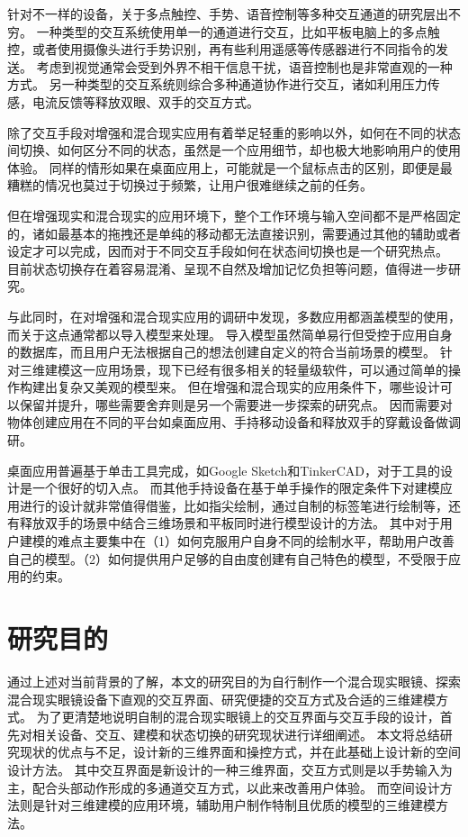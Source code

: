 针对不一样的设备，关于多点触控、手势、语音控制等多种交互通道的研究层出不穷。
一种类型的交互系统使用单一的通道进行交互，比如平板电脑上的多点触控，或者使用摄像头进行手势识别，再有些利用遥感等传感器进行不同指令的发送。
考虑到视觉通常会受到外界不相干信息干扰，语音控制也是非常直观的一种方式。
另一种类型的交互系统则综合多种通道协作进行交互，诸如利用压力传感，电流反馈等释放双眼、双手的交互方式。

除了交互手段对增强和混合现实应用有着举足轻重的影响以外，如何在不同的状态间切换、如何区分不同的状态，虽然是一个应用细节，却也极大地影响用户的使用体验。
同样的情形如果在桌面应用上，可能就是一个鼠标点击的区别，即便是最糟糕的情况也莫过于切换过于频繁，让用户很难继续之前的任务。

但在增强现实和混合现实的应用环境下，整个工作环境与输入空间都不是严格固定的，诸如最基本的拖拽还是单纯的移动都无法直接识别，需要通过其他的辅助或者设定才可以完成，因而对于不同交互手段如何在状态间切换也是一个研究热点。
目前状态切换存在着容易混淆、呈现不自然及增加记忆负担等问题，值得进一步研究。

与此同时，在对增强和混合现实应用的调研中发现，多数应用都涵盖模型的使用，而关于这点通常都以导入模型来处理。
导入模型虽然简单易行但受控于应用自身的数据库，而且用户无法根据自己的想法创建自定义的符合当前场景的模型。
针对三维建模这一应用场景，现下已经有很多相关的轻量级软件，可以通过简单的操作构建出复杂又美观的模型来。
但在增强和混合现实的应用条件下，哪些设计可以保留并提升，哪些需要舍弃则是另一个需要进一步探索的研究点。
因而需要对物体创建应用在不同的平台如桌面应用、手持移动设备和释放双手的穿戴设备做调研。

桌面应用普遍基于单击工具完成，如Google Sketch和TinkerCAD，对于工具的设计是一个很好的切入点。
而其他手持设备在基于单手操作的限定条件下对建模应用进行的设计就非常值得借鉴，比如指尖绘制，通过自制的标签笔进行绘制等，还有释放双手的场景中结合三维场景和平板同时进行模型设计的方法。
其中对于用户建模的难点主要集中在（1）如何克服用户自身不同的绘制水平，帮助用户改善自己的模型。（2）如何提供用户足够的自由度创建有自己特色的模型，不受限于应用的约束。

\section{研究目的}
\label{sec:xulun-mudi}
通过上述对当前背景的了解，本文的研究目的为自行制作一个混合现实眼镜、探索混合现实眼镜设备下直观的交互界面、研究便捷的交互方式及合适的三维建模方式。
为了更清楚地说明自制的混合现实眼镜上的交互界面与交互手段的设计，首先对相关设备、交互、建模和状态切换的研究现状进行详细阐述。
本文将总结研究现状的优点与不足，设计新的三维界面和操控方式，并在此基础上设计新的空间设计方法。
其中交互界面是新设计的一种三维界面，交互方式则是以手势输入为主，配合头部动作形成的多通道交互方式，以此来改善用户体验。
而空间设计方法则是针对三维建模的应用环境，辅助用户制作特制且优质的模型的三维建模方法。

